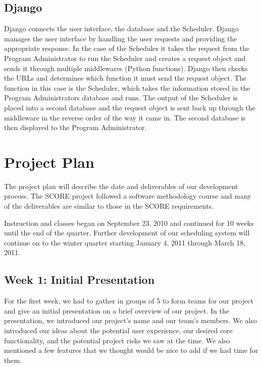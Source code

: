 \documentclass[12pt]{article}
\begin{document}
\begin{enumerate}
\subsection{Django}
Django connects the user interface, the database and the Scheduler. Django manages the user interface by handling the user requests and providing the appropriate response. In the case of the Scheduler it takes the request from the Program Administrator to run the Scheduler and creates a request object and sends it through multiple middlewares (Python functions). Django then checks the URLs and determines which function it must send the request object. The function in this case is the Scheduler, which takes the information stored in the Program Administrators database and runs. The output of the Scheduler is placed into a second database and the request object is sent back up through the middleware in the reverse order of the way it came in. The second database is then displayed to the Program Administrator.

\section{Project Plan} %

The project plan will describe the date and deliverables of our development process. The SCORE project followed a software methodology course and many of the deliverables are similar to those in the SCORE requirements. 

Instruction and classes began on September 23, 2010 and continued for 10 weeks until the end of the quarter. Further development of our scheduling system will continue on to the winter quarter starting January 4, 2011 through March 18, 2011. 

\subsection*{Week 1: Initial Presentation}

For the first week, we had to gather in groups of 5 to form teams for our project and give an initial presentation on a brief overview of our project. In the presentation, we introduced our project's name and our team's members. We also introduced our ideas about the potential user experience, our desired core functionality, and the potential project risks we saw at the time. We also mentioned a few features that we thought would be nice to add if we had time for them.


\end{enumerate}
\end{document}
